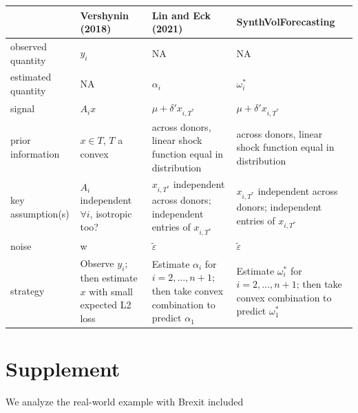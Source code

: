 \documentclass[11pt]{article}
\def\t#1{\tilde{#1}} %
\theoremstyle{definition}
\begin{document}
\begin{table}[h!]
\begin{tabular}{|p{1.3in}|p{1.6in}|p{1.9in}|p{1.9in}|}
\hline
 & Vershynin (2018) & Lin and Eck (2021) & SynthVolForecasting \\ \hline
observed quantity& $y_{i}$  & NA & NA \\ \hline
estimated quantity&  NA& $\alpha_{i}$ &  $\omega^{*}_{i}$\\ \hline
signal & $A_{i}x$ & $\mu + \delta'x_{i,T^{*}}$ & $\mu + \delta'x_{i,T^{*}}$  \\ \hline
prior information & $x\in T$, $T$ a convex & across donors, linear shock function equal in distribution  &  across donors, linear shock function equal in distribution \\ \hline
key assumption(s) & $A_{i}$ independent $\forall i$, isotropic too? & $x_{i,T^{*}}$ independent across donors; independent entries of $x_{i,T^{*}}$ & $x_{i,T^{*}}$ independent across donors; independent entries of $x_{i,T^{*}}$ \\ \hline
noise& w & $\t\varepsilon$  & $\t\varepsilon$   \\ \hline
strategy& Observe $y_{i}$; then estimate $x$ with small expected L2 loss & Estimate $\alpha_{i}$ for $i = 2,...,n+1$; then take convex combination to predict $\alpha_{1}$  & Estimate $\omega^{*}_{i}$ for $i = 2,...,n+1$; then take convex combination to predict $\omega^{*}_{1}$ \\ \hline
\end{tabular}
\end{table}

\section{Supplement}

We analyze the real-world example with Brexit included

\clearpage




  
\end{document}
